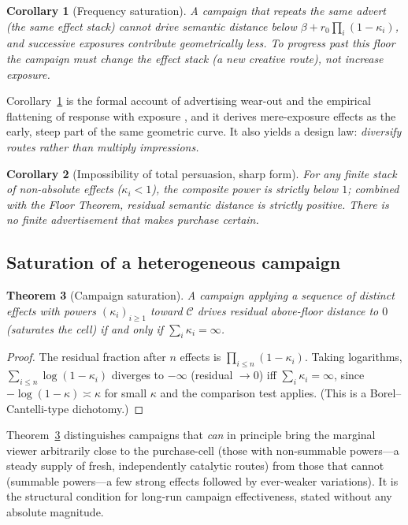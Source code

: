 \documentclass[twocolumn,11pt,a4paper]{article}
\theoremstyle{adv}
\newtheorem{theorem}{Theorem}[section]
\newtheorem{corollary}[theorem]{Corollary}
\theoremstyle{definition}
\theoremstyle{remark}
\newcommand{\Cell}{\mathcal{C}}        %
\newcommand{\floor}{\beta}            %
\newcommand{\pot}{\kappa}             %
\begin{document}
\begin{corollary}[Frequency saturation]
\label{cor:frequency}
A campaign that repeats the \emph{same} advert (the same effect stack)
cannot drive semantic distance below
$\floor + r_0\prod_i(1-\pot_i)$, and successive exposures contribute
geometrically less. To progress past this floor the campaign must change
the effect stack (a new creative route), not increase exposure.
\end{corollary}

Corollary~\ref{cor:frequency} is the formal account of advertising wear-out
and the empirical flattening of response with exposure
\citep{tellis1988,vakratsas1999}, and it derives mere-exposure effects
\citep{zajonc1968} as the early, steep part of the same geometric curve.
It also yields a design law: \emph{diversify routes rather than multiply
impressions.}

\begin{corollary}[Impossibility of total persuasion, sharp form]
\label{cor:impossible}
For any finite stack of non-absolute effects ($\pot_i<1$), the composite
power is strictly below $1$; combined with the Floor Theorem, residual
semantic distance is strictly positive. There is no finite advertisement
that makes purchase certain.
\end{corollary}

\subsection{Saturation of a heterogeneous campaign}

\begin{theorem}[Campaign saturation]
\label{thm:saturation}
A campaign applying a sequence of distinct effects with powers
$(\pot_i)_{i\ge1}$ toward $\Cell$ drives residual above-floor distance to
$0$ (saturates the cell) if and only if $\sum_i\pot_i=\infty$.
\end{theorem}

\begin{proof}
The residual fraction after $n$ effects is $\prod_{i\le n}(1-\pot_i)$.
Taking logarithms, $\sum_{i\le n}\log(1-\pot_i)$ diverges to $-\infty$
(residual $\to0$) iff $\sum_i\pot_i=\infty$, since
$-\log(1-\pot)\asymp\pot$ for small $\pot$ and the comparison test
applies. (This is a Borel--Cantelli-type dichotomy.)
\end{proof}

Theorem~\ref{thm:saturation} distinguishes campaigns that \emph{can} in
principle bring the marginal viewer arbitrarily close to the purchase-cell
(those with non-summable powers---a steady supply of fresh, independently
catalytic routes) from those that cannot (summable powers---a few strong
effects followed by ever-weaker variations). It is the structural
condition for long-run campaign effectiveness, stated without any absolute
magnitude.
\end{document}
